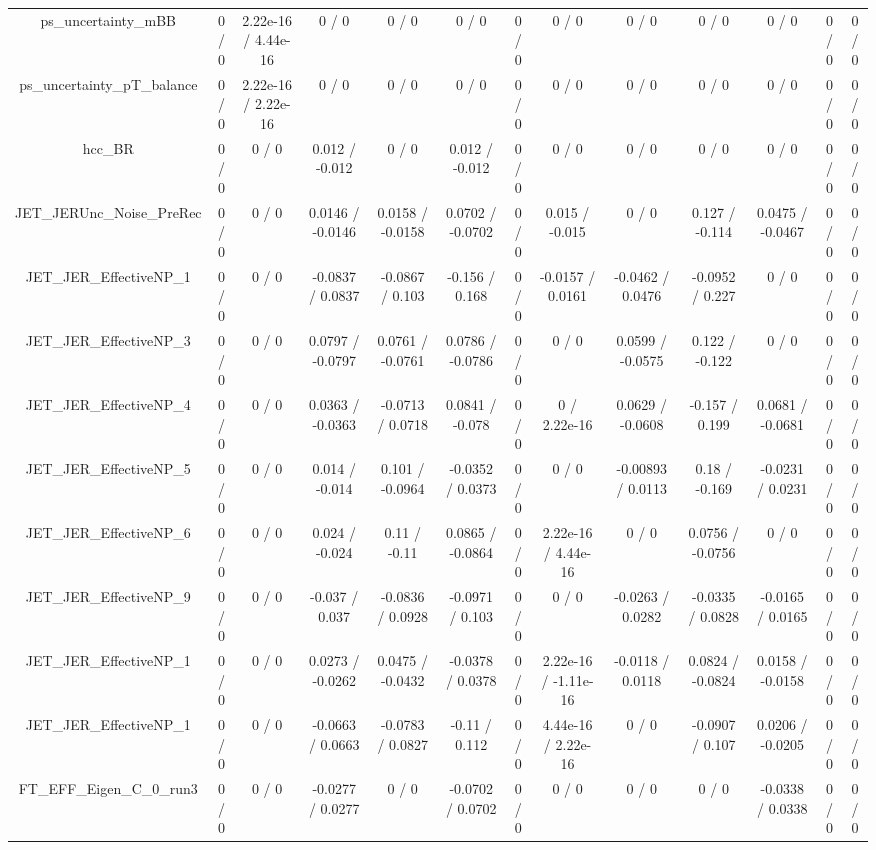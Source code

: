 \documentclass[10pt]{article}
\begin{document}
\begin{table}[htbp]
\begin{center}
\begin{tabular}{|c|c|c|c|c|c|c|c|c|c|c|c|c|}
  ps_uncertainty_mBB & 0 / 0 & 2.22e-16 / 4.44e-16 & 0 / 0 & 0 / 0 & 0 / 0 & 0 / 0 & 0 / 0 & 0 / 0 & 0 / 0 & 0 / 0 & 0 / 0 & 0 / 0 \\ 
  ps_uncertainty_pT_balance & 0 / 0 & 2.22e-16 / 2.22e-16 & 0 / 0 & 0 / 0 & 0 / 0 & 0 / 0 & 0 / 0 & 0 / 0 & 0 / 0 & 0 / 0 & 0 / 0 & 0 / 0 \\ 
  hcc_BR & 0 / 0 & 0 / 0 & 0.012 / -0.012 & 0 / 0 & 0.012 / -0.012 & 0 / 0 & 0 / 0 & 0 / 0 & 0 / 0 & 0 / 0 & 0 / 0 & 0 / 0 \\ 
  JET_JERUnc_Noise_PreRec & 0 / 0 & 0 / 0 & 0.0146 / -0.0146 & 0.0158 / -0.0158 & 0.0702 / -0.0702 & 0 / 0 & 0.015 / -0.015 & 0 / 0 & 0.127 / -0.114 & 0.0475 / -0.0467 & 0 / 0 & 0 / 0 \\ 
  JET_JER_EffectiveNP_1 & 0 / 0 & 0 / 0 & -0.0837 / 0.0837 & -0.0867 / 0.103 & -0.156 / 0.168 & 0 / 0 & -0.0157 / 0.0161 & -0.0462 / 0.0476 & -0.0952 / 0.227 & 0 / 0 & 0 / 0 & 0 / 0 \\ 
  JET_JER_EffectiveNP_3 & 0 / 0 & 0 / 0 & 0.0797 / -0.0797 & 0.0761 / -0.0761 & 0.0786 / -0.0786 & 0 / 0 & 0 / 0 & 0.0599 / -0.0575 & 0.122 / -0.122 & 0 / 0 & 0 / 0 & 0 / 0 \\ 
  JET_JER_EffectiveNP_4 & 0 / 0 & 0 / 0 & 0.0363 / -0.0363 & -0.0713 / 0.0718 & 0.0841 / -0.078 & 0 / 0 & 0 / 2.22e-16 & 0.0629 / -0.0608 & -0.157 / 0.199 & 0.0681 / -0.0681 & 0 / 0 & 0 / 0 \\ 
  JET_JER_EffectiveNP_5 & 0 / 0 & 0 / 0 & 0.014 / -0.014 & 0.101 / -0.0964 & -0.0352 / 0.0373 & 0 / 0 & 0 / 0 & -0.00893 / 0.0113 & 0.18 / -0.169 & -0.0231 / 0.0231 & 0 / 0 & 0 / 0 \\ 
  JET_JER_EffectiveNP_6 & 0 / 0 & 0 / 0 & 0.024 / -0.024 & 0.11 / -0.11 & 0.0865 / -0.0864 & 0 / 0 & 2.22e-16 / 4.44e-16 & 0 / 0 & 0.0756 / -0.0756 & 0 / 0 & 0 / 0 & 0 / 0 \\ 
  JET_JER_EffectiveNP_9 & 0 / 0 & 0 / 0 & -0.037 / 0.037 & -0.0836 / 0.0928 & -0.0971 / 0.103 & 0 / 0 & 0 / 0 & -0.0263 / 0.0282 & -0.0335 / 0.0828 & -0.0165 / 0.0165 & 0 / 0 & 0 / 0 \\ 
  JET_JER_EffectiveNP_1 & 0 / 0 & 0 / 0 & 0.0273 / -0.0262 & 0.0475 / -0.0432 & -0.0378 / 0.0378 & 0 / 0 & 2.22e-16 / -1.11e-16 & -0.0118 / 0.0118 & 0.0824 / -0.0824 & 0.0158 / -0.0158 & 0 / 0 & 0 / 0 \\ 
  JET_JER_EffectiveNP_1 & 0 / 0 & 0 / 0 & -0.0663 / 0.0663 & -0.0783 / 0.0827 & -0.11 / 0.112 & 0 / 0 & 4.44e-16 / 2.22e-16 & 0 / 0 & -0.0907 / 0.107 & 0.0206 / -0.0205 & 0 / 0 & 0 / 0 \\ 
  FT_EFF_Eigen_C_0_run3 & 0 / 0 & 0 / 0 & -0.0277 / 0.0277 & 0 / 0 & -0.0702 / 0.0702 & 0 / 0 & 0 / 0 & 0 / 0 & 0 / 0 & -0.0338 / 0.0338 & 0 / 0 & 0 / 0 \\ 

\end{tabular}
\end{center}
\end{table}
\end{document}
